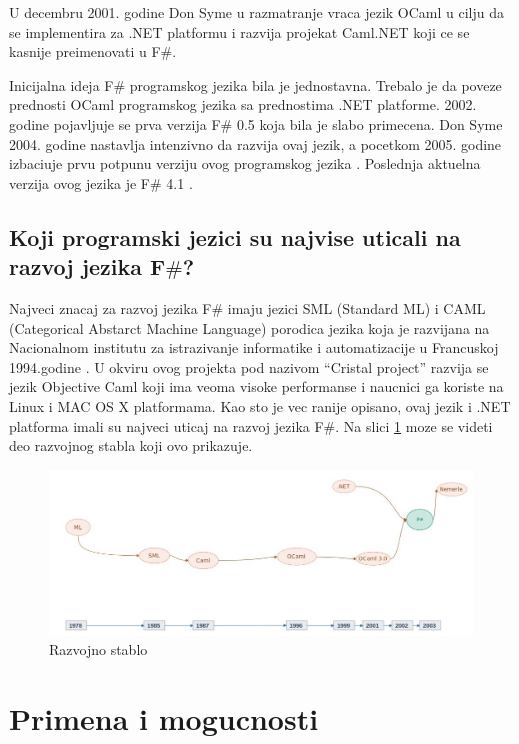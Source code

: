 \documentclass[a4paper]{article}
\begin{document}
U decembru 2001. godine Don Syme u razmatranje vraca jezik OCaml u cilju da se implementira za .NET platformu i razvija projekat Caml.NET koji ce se kasnije preimenovati u F$\#$.

Inicijalna ideja F$\#$ programskog jezika bila je jednostavna. Trebalo je da poveze prednosti OCaml programskog jezika sa prednostima .NET platforme. 2002. godine pojavljuje se prva verzija F$\#$ 0.5 koja bila je slabo primecena. Don Syme 2004. godine nastavlja intenzivno da razvija ovaj jezik, a pocetkom 2005. godine izbaciuje prvu potpunu verziju ovog programskog jezika \cite{early_history}.
Poslednja aktuelna verzija ovog jezika je F$\#$ 4.1 \cite{fsharp}.

\subsection{Koji programski jezici su najvise uticali na razvoj jezika F$\#$?}
\label{subsec:uticaj}

Najveci znacaj za razvoj jezika F$\#$ imaju jezici SML (Standard ML) i CAML (Categorical Abstarct Machine Language) porodica jezika koja je razvijana na Nacionalnom institutu za istrazivanje informatike i automatizacije u Francuskoj 1994.godine \cite{Harrop:2008:FS:1481410}. U okviru ovog projekta pod nazivom “Cristal project” razvija se jezik Objective Caml koji ima veoma visoke performanse i naucnici ga koriste na Linux i MAC OS X platformama. Kao sto je vec ranije opisano, ovaj jezik i .NET platforma imali su najveci uticaj na razvoj jezika F$\#$. Na slici \ref{fig:stablo} moze se videti deo razvojnog stabla koji ovo prikazuje.

\begin{figure}[h!]
\begin{center}
\includegraphics[scale=0.29]{stablo.jpg}
\end{center}
\caption{Razvojno stablo}
\label{fig:stablo}
\end{figure}


\section{Primena i mogucnosti}
\label{sec:primena}
\end{document}
